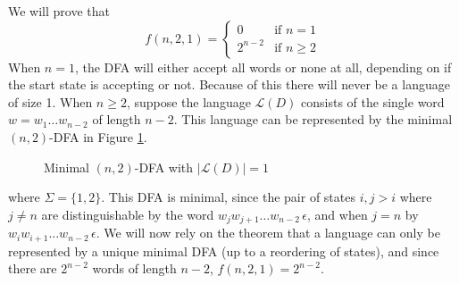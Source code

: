 \documentclass[10pt,a4paper,notitlepage]{article}
\newcommand{\abs}[1]{\lvert#1\rvert}
\begin{document}
We will prove that
\begin{equation}
f(n,2,1)=\begin{cases}
      0 & \text{if $n=1$}\\
      2^{n-2} & \text{if $n\geq 2$}
    \end{cases}
\end{equation}
When $n=1$, the DFA will either accept all words or none at all, depending on if the start state is accepting or not. Because of this there will never be a language of size 1. When $n\geq 2$, suppose the language $\mathcal{L}(D)$ consists of the single word $w=w_{1}\hdots w_{n-2}$ of length $n-2$. This language can be represented by the minimal $(n,2)$-DFA in Figure \ref{fg:2}.
\begin{figure}[H]
\centering
{}
\caption{Minimal $(n,2)$-DFA with $\abs{\mathcal{L}(D)}=1$}\label{fg:2}
\end{figure}
where $\Sigma=\lbrace 1,2\rbrace$.  This DFA is  minimal, since the pair of states $i,j>i$ where $j\neq n$ are distinguishable by the word $w_{j}w_{j+1}\hdots w_{n-2} \, \epsilon$, and when $j=n$ by $w_{i}w_{i+1}\hdots w_{n-2}\, \epsilon $. We will now rely on the theorem that a language can only be represented by a unique minimal DFA (up to a reordering of states), and since there are $2^{n-2}$ words of length $n-2$, $f(n,2,1)= 2^{n-2}$.\\
\end{document}
